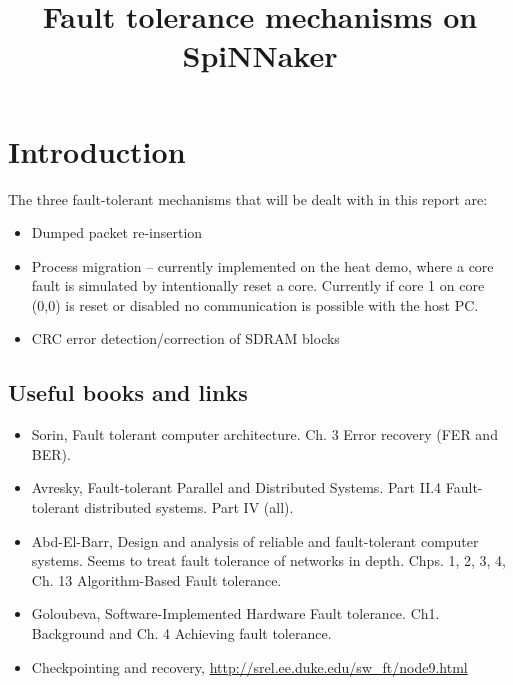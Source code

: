 \documentclass[oneside, a4paper, 11pt]{memoir}
\title{Fault tolerance mechanisms on SpiNNaker}
\begin{document}
\maketitle



\chapter{Introduction}
The three fault-tolerant mechanisms that will be dealt with in this report are:
\begin{itemize}
\item Dumped packet re-insertion
\item Process migration -- currently implemented on the heat demo, where a core fault is simulated by intentionally reset a core. Currently if core 1 on core (0,0) is reset or disabled no communication is possible with the host PC.
\item CRC error detection/correction of SDRAM blocks
\end{itemize}
	
\section{Useful books and links}
\begin{itemize}
\item Sorin, Fault tolerant computer architecture. Ch. 3 Error recovery (FER and BER).
\item Avresky, Fault-tolerant Parallel and Distributed Systems. Part II.4 Fault-tolerant distributed systems. Part IV (all).
\item Abd-El-Barr, Design and analysis of reliable and fault-tolerant computer systems. Seems to treat fault tolerance of networks in depth. Chps. 1, 2, 3, 4, Ch. 13 Algorithm-Based Fault tolerance.
\item Goloubeva, Software-Implemented Hardware Fault tolerance. Ch1. Background and Ch. 4 Achieving fault tolerance.
\item Checkpointing and recovery, \url{http://srel.ee.duke.edu/sw_ft/node9.html}
\end{itemize}
\end{document}
